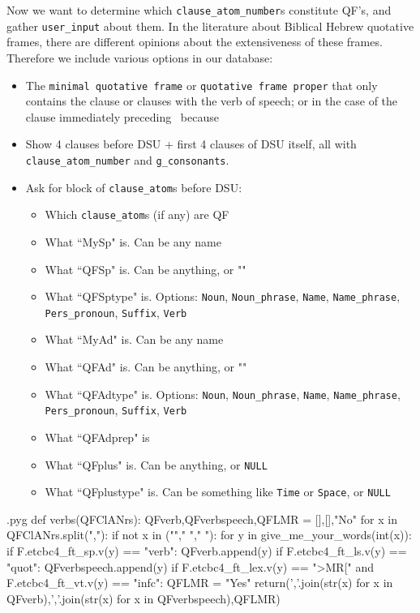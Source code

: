 \documentclass{report}
\makeatletter
\newcommand{\mi}[1]{\lstinline{#1}}
\newenvironment{python}{%
  \VerbatimEnvironment
  \minted@resetoptions
  \setkeys{minted@opt}{}
      \begin{VerbatimOut}{\jobname.pyg}}
{%
      \end{VerbatimOut}
      \minted@pygmentize{python}
      \DeleteFile{\jobname.pyg}}
\makeatother
\begin{document}
\begin{multicols}{2}
Now we want to determine which \mi{clause_atom_number}s constitute QF's, and gather \mi{user_input} about them. In the literature about Biblical Hebrew quotative frames, there are different opinions about the extensiveness of these frames. Therefore we include various options in our database:
\begin{itemize}
    \item The \mi{minimal quotative frame} or \mi{quotative frame proper} that only contains the clause or clauses with the verb of speech; or in the case of  the clause immediately preceding \ because 
\end{itemize}


\begin{itemize}
 \item Show 4 clauses before DSU + first 4 clauses of DSU itself, all with \mi{clause_atom_number} and \mi{g_consonants}.
 \item Ask for block of \mi{clause_atom}s before DSU:
 \begin{itemize}
    \item Which \mi{clause_atom}s (if any) are QF
    \item What ``MySp" is. Can be any name
    \item What ``QFSp" is. Can be anything, or ""
    \item What ``QFSptype" is. Options: \mi{Noun}, \mi{Noun_phrase}, \mi{Name}, \mi{Name_phrase}, \mi{Pers_pronoun}, \mi{Suffix}, \mi{Verb}
    \item What ``MyAd" is. Can be any name
    \item What ``QFAd" is. Can be anything, or ""
    \item What ``QFAdtype" is. Options: \mi{Noun}, \mi{Noun_phrase}, \mi{Name}, \mi{Name_phrase}, \mi{Pers_pronoun}, \mi{Suffix}, \mi{Verb}
    \item What ``QFAdprep" is
    \item What ``QFplus" is. Can be anything, or \mi{NULL}
    \item What ``QFplustype" is. Can be something like \mi{Time} or \mi{Space}, or \mi{NULL}
  \end{itemize}
\end{itemize}
\end{multicols}

\begin{python}
def verbs(QFClANrs):
    QFverb,QFverbspeech,QFLMR = [],[],"No"
    for x in QFClANrs.split(","):
        if not x in (""," ","  "):
            for y in give_me_your_words(int(x)):
                if F.etcbc4_ft_sp.v(y) == "verb":
                    QFverb.append(y)
                    if F.etcbc4_ft_ls.v(y) == "quot":
                        QFverbspeech.append(y)
                        if F.etcbc4_ft_lex.v(y) == ">MR[" and F.etcbc4_ft_vt.v(y) == "infc":
                            QFLMR = "Yes"
    return(','.join(str(x) for x in QFverb),','.join(str(x) for x in QFverbspeech),QFLMR)

\end{python}
\end{document}
